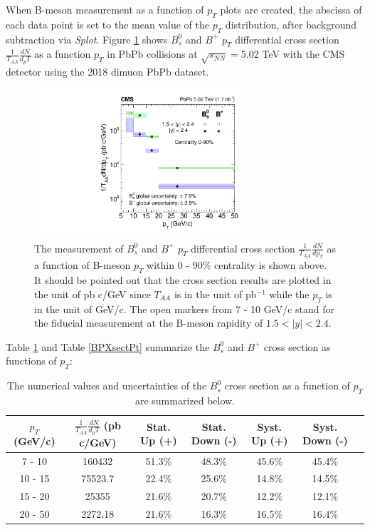 When B-meson measurement as a function of $p_T$ plots are created, the abscissa of each data point is set to the mean value of the $p_T$ distribution, after background subtraction via \textit{Splot}. Figure \ref{BmesonDataPt} shows $B^0_s$ and $B^+$ $p_T$ differential cross section $\frac{1}{T_{AA}} \frac{dN}{d_pT}$ as a function $p_T$ in PbPb collisions at $\sqrt{s_{NN}} = $5.02 TeV with the CMS detector using the 2018 dimuon PbPb dataset.

\begin{figure}[hbtp]
\begin{center}
\includegraphics[width=0.70\textwidth]{Figures/Chapter5/xsec_vsPt.pdf}
\caption{The measurement of $B^0_s$ and $B^+$ $p_T$ differential cross section $\frac{1}{T_{AA}} \frac{dN}{d p_T}$ as a function of B-meson $p_T$ within 0 - 90\% centrality is shown above. It should be pointed out that the cross section results are plotted in the unit of pb c/GeV since $T_{AA}$ is in the unit of pb$^{-1}$ while the $p_T$ is in the unit of GeV/c. The open markers from 7 - 10 GeV/c stand for the fiducial measurement at the B-meson rapidity of $1.5 < |y| < 2.4$.}
\label{BmesonDataPt}
\end{center}
\end{figure}

Table \ref{BsXsectPt} and Table \ref{BPXsectPt} summarize the $B^0_s$ and $B^+$ cross section as functions of $p_T$:

\begin{table}[h]
\begin{center}
\caption{The numerical values and uncertainties of the $B^0_s$ cross section as a function of $p_T$ are summarized below.}
\vspace{1em}
\label{BsXsectPt}
  \begin{tabular}{| c | c |c | c| c| c| c|}
    \hline
$p_T$ (GeV/c) &  $\frac{1}{T_{AA}} \frac{dN}{d_pT}$ (pb c/GeV) & Stat. Up (+)   & Stat. Down (-)  &  Syst. Up (+)  &  Syst. Down (-) \\
    \hline
    \hline
 7 - 10 &   160432  &  51.3\% & 48.3\% & 45.6\% & 45.4\% \\ 
 10 - 15 & 75523.7  & 22.4\%  & 25.6\%  & 14.8\% & 14.5\% \\ 
 15 - 20 &  25355 & 21.6\%   &  20.7\% & 12.2\% & 12.1\% \\ 
 20 - 50 &  2272.18    & 21.6\%  &  16.3\% & 16.5\% &16.4\% \\ 
    \hline
    \hline
\end{tabular}
\end{center}
\end{table}


